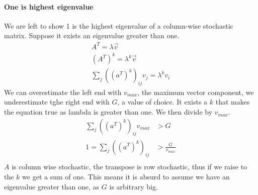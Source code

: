 \paragraph{One is highest eigenvalue}
We are left to show 1 is the highest eigenvalue of a column-wise stochastic matrix. Suppose it exists an eigenvalue greater than one.
\begin{equation}
    \begin{aligned}
        A^T = \lambda\vec{v}\\
        (A^T)^k = \lambda^k\vec{v} \\
        \sum_j((a^T)^k)_{ij}v_j = \lambda^kv_i
    \end{aligned}
\end{equation}
We can overestimate the left end with $v_\mathit{max}$, the maximum vector component, we underestimate tghe right end with $G$, a value of choice. 
It exists a $k$ that makes the equation true as lambda is greater than one. We then divide by $v_\mathit{max}$.
\begin{equation}
    \begin{aligned}
        \sum_j((a^T)^k)_{ij}v_\mathit{max} &> G\\
        1 = \sum_j((a^T)^k)_{ij} &> \frac{G}{v_\mathit{max}}\\
    \end{aligned}
\end{equation}
$A$ is column wise stochastic, the transpose is row stochastic, thus if we raise to the $k$ we get a sum of one. 
This means it is absurd to assume we have an eigenvalue greater than one, as $G$ is arbitrary big.

